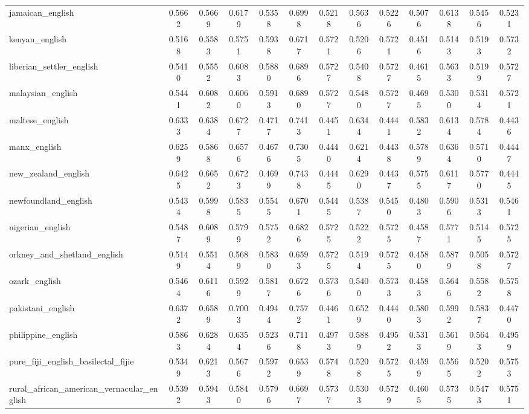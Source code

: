 \begin{landscape}
\begin{longtable}{lcccccccccccc}
jamaican\_english & 0.5662 & 0.5669 & 0.6179 & 0.5358 & 0.6998 & 0.5218 & 0.5636 & 0.5226 & 0.5076 & 0.6138 & 0.5456 & 0.5231 \\
kenyan\_english & 0.5168 & 0.5583 & 0.5751 & 0.5938 & 0.6717 & 0.5721 & 0.5206 & 0.5721 & 0.4516 & 0.5143 & 0.5193 & 0.5732 \\
liberian\_settler\_english & 0.5410 & 0.5552 & 0.6083 & 0.5880 & 0.6896 & 0.5727 & 0.5408 & 0.5727 & 0.4615 & 0.5633 & 0.5199 & 0.5727 \\
malaysian\_english & 0.5441 & 0.6082 & 0.6060 & 0.5913 & 0.6890 & 0.5727 & 0.5480 & 0.5727 & 0.4695 & 0.5300 & 0.5314 & 0.5721 \\
maltese\_english & 0.6333 & 0.6384 & 0.6727 & 0.4717 & 0.7413 & 0.4451 & 0.6344 & 0.4441 & 0.5832 & 0.6134 & 0.5784 & 0.4436 \\
manx\_english & 0.6259 & 0.5868 & 0.6576 & 0.4676 & 0.7305 & 0.4440 & 0.6214 & 0.4438 & 0.5789 & 0.6364 & 0.5710 & 0.4447 \\
new\_zealand\_english & 0.6425 & 0.6652 & 0.6723 & 0.4699 & 0.7438 & 0.4445 & 0.6290 & 0.4437 & 0.5755 & 0.6117 & 0.5770 & 0.4445 \\
newfoundland\_english & 0.5434 & 0.5998 & 0.5835 & 0.5545 & 0.6701 & 0.5445 & 0.5387 & 0.5450 & 0.4803 & 0.5906 & 0.5313 & 0.5461 \\
nigerian\_english & 0.5487 & 0.6089 & 0.5799 & 0.5752 & 0.6826 & 0.5725 & 0.5222 & 0.5725 & 0.4587 & 0.5771 & 0.5145 & 0.5725 \\
orkney\_and\_shetland\_english & 0.5149 & 0.5514 & 0.5689 & 0.5830 & 0.6593 & 0.5725 & 0.5194 & 0.5725 & 0.4580 & 0.5879 & 0.5058 & 0.5727 \\
ozark\_english & 0.5464 & 0.6116 & 0.5929 & 0.5817 & 0.6726 & 0.5736 & 0.5400 & 0.5733 & 0.4583 & 0.5646 & 0.5582 & 0.5758 \\
pakistani\_english & 0.6372 & 0.6589 & 0.7003 & 0.4944 & 0.7572 & 0.4461 & 0.6529 & 0.4440 & 0.5803 & 0.5992 & 0.5837 & 0.4470 \\
philippine\_english & 0.5863 & 0.6284 & 0.6354 & 0.5236 & 0.7118 & 0.4973 & 0.5889 & 0.4952 & 0.5313 & 0.5619 & 0.5643 & 0.4959 \\
pure\_fiji\_english\_basilectal\_fijie & 0.5349 & 0.6213 & 0.5676 & 0.5972 & 0.6539 & 0.5748 & 0.5208 & 0.5725 & 0.4599 & 0.5565 & 0.5202 & 0.5753 \\
rural\_african\_american\_vernacular\_english & 0.5392 & 0.5943 & 0.5840 & 0.5796 & 0.6697 & 0.5737 & 0.5303 & 0.5729 & 0.4605 & 0.5735 & 0.5473 & 0.5751 \\

\end{longtable}
\end{landscape}
